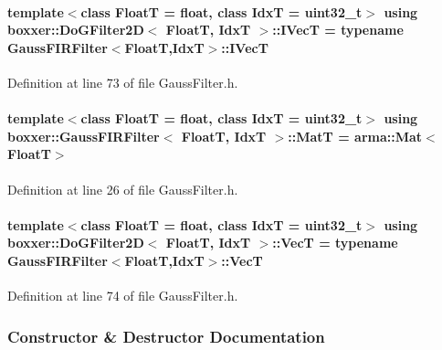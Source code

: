 \paragraph[{\texorpdfstring{I\+VecT}{IVecT}}]{\setlength{\rightskip}{0pt plus 5cm}template$<$class FloatT  = float, class IdxT  = uint32\+\_\+t$>$ using {\bf boxxer\+::\+Do\+G\+Filter2D}$<$ FloatT, IdxT $>$\+::{\bf I\+VecT} =  typename {\bf Gauss\+F\+I\+R\+Filter}$<$FloatT,IdxT$>$\+::{\bf I\+VecT}}\hypertarget{classboxxer_1_1DoGFilter2D_a3cf901b2a5f6254149ca635244176c7f}{}\label{classboxxer_1_1DoGFilter2D_a3cf901b2a5f6254149ca635244176c7f}


Definition at line 73 of file Gauss\+Filter.\+h.

\paragraph[{\texorpdfstring{MatT}{MatT}}]{\setlength{\rightskip}{0pt plus 5cm}template$<$class FloatT = float, class IdxT = uint32\+\_\+t$>$ using {\bf boxxer\+::\+Gauss\+F\+I\+R\+Filter}$<$ FloatT, IdxT $>$\+::{\bf MatT} =  arma\+::\+Mat$<$FloatT$>$\hspace{0.3cm}{\ttfamily [inherited]}}\hypertarget{classboxxer_1_1GaussFIRFilter_a83cf4c7f4782f69918c0e0883fff5412}{}\label{classboxxer_1_1GaussFIRFilter_a83cf4c7f4782f69918c0e0883fff5412}


Definition at line 26 of file Gauss\+Filter.\+h.

\paragraph[{\texorpdfstring{VecT}{VecT}}]{\setlength{\rightskip}{0pt plus 5cm}template$<$class FloatT  = float, class IdxT  = uint32\+\_\+t$>$ using {\bf boxxer\+::\+Do\+G\+Filter2D}$<$ FloatT, IdxT $>$\+::{\bf VecT} =  typename {\bf Gauss\+F\+I\+R\+Filter}$<$FloatT,IdxT$>$\+::{\bf VecT}}\hypertarget{classboxxer_1_1DoGFilter2D_a77bd6efdb8dc5643aa30c2575c9da261}{}\label{classboxxer_1_1DoGFilter2D_a77bd6efdb8dc5643aa30c2575c9da261}


Definition at line 74 of file Gauss\+Filter.\+h.



\subsubsection{Constructor \& Destructor Documentation}
